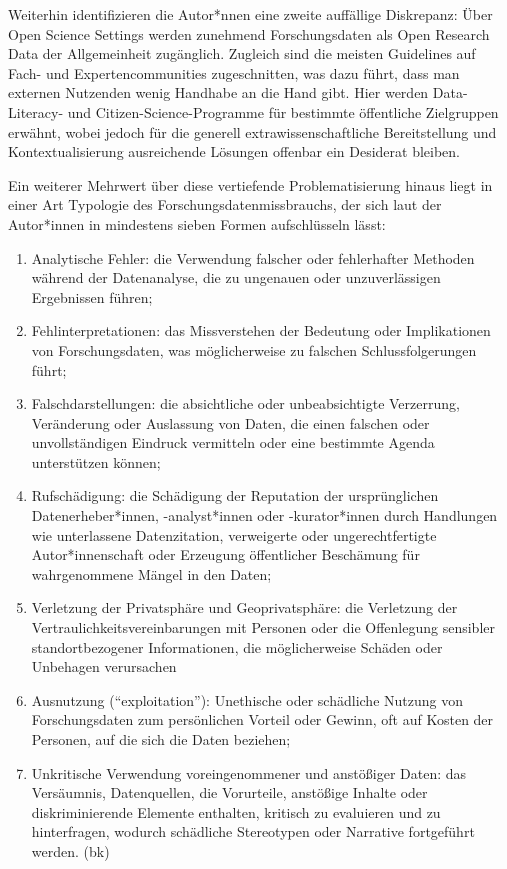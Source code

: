 \documentclass[a4paper,
fontsize=11pt,
oneside,
numbers=noperiodatend,
parskip=half-,
bibliography=totoc,
final
]{scrartcl}
\begin{document}
Weiterhin identifizieren die Autor*nnen eine zweite auffällige
Diskrepanz: Über Open Science Settings werden zunehmend Forschungsdaten
als Open Research Data der Allgemeinheit zugänglich. Zugleich sind die
meisten Guidelines auf Fach- und Expertencommunities zugeschnitten, was
dazu führt, dass man externen Nutzenden wenig Handhabe an die Hand gibt.
Hier werden Data-Literacy- und Citizen-Science-Programme für bestimmte
öffentliche Zielgruppen erwähnt, wobei jedoch für die generell
extrawissenschaftliche Bereitstellung und Kontextualisierung
ausreichende Lösungen offenbar ein Desiderat bleiben.

Ein weiterer Mehrwert über diese vertiefende Problematisierung hinaus
liegt in einer Art Typologie des Forschungsdatenmissbrauchs, der sich
laut der Autor*innen in mindestens sieben Formen aufschlüsseln lässt:

\begin{enumerate}
\def\labelenumi{\arabic{enumi}.}
\item
  Analytische Fehler: die Verwendung falscher oder fehlerhafter Methoden
  während der Datenanalyse, die zu ungenauen oder unzuverlässigen
  Ergebnissen führen;
\item
  Fehlinterpretationen: das Missverstehen der Bedeutung oder
  Implikationen von Forschungsdaten, was möglicherweise zu falschen
  Schlussfolgerungen führt;
\item
  Falschdarstellungen: die absichtliche oder unbeabsichtigte Verzerrung,
  Veränderung oder Auslassung von Daten, die einen falschen oder
  unvollständigen Eindruck vermitteln oder eine bestimmte Agenda
  unterstützen können;
\item
  Rufschädigung: die Schädigung der Reputation der ursprünglichen
  Datenerheber*innen, -analyst*innen oder -kurator*innen durch
  Handlungen wie unterlassene Datenzitation, verweigerte oder
  ungerechtfertigte Autor*innenschaft oder Erzeugung öffentlicher
  Beschämung für wahrgenommene Mängel in den Daten;
\item
  Verletzung der Privatsphäre und Geoprivatsphäre: die Verletzung der
  Vertraulichkeitsvereinbarungen mit Personen oder die Offenlegung
  sensibler standortbezogener Informationen, die möglicherweise Schäden
  oder Unbehagen verursachen
\item
  Ausnutzung (``exploitation''): Unethische oder schädliche Nutzung von
  Forschungsdaten zum persönlichen Vorteil oder Gewinn, oft auf Kosten
  der Personen, auf die sich die Daten beziehen;
\item
  Unkritische Verwendung voreingenommener und anstößiger Daten: das
  Versäumnis, Datenquellen, die Vorurteile, anstößige Inhalte oder
  diskriminierende Elemente enthalten, kritisch zu evaluieren und zu
  hinterfragen, wodurch schädliche Stereotypen oder Narrative
  fortgeführt werden. (bk)
\end{enumerate}
\end{document}

